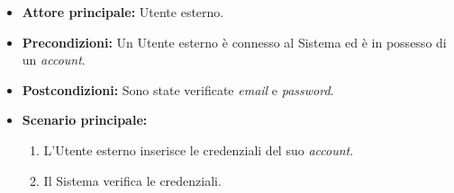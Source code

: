 \label{usecase:Accesso tradizionale}
\begin{itemize}

	\item \textbf{Attore principale:} Utente esterno.

	\item \textbf{Precondizioni:} Un Utente esterno è connesso al Sistema ed è in possesso di un \textit{account}.

	\item \textbf{Postcondizioni:} Sono state verificate \textit{email} e \textit{password}.

	\item \textbf{Scenario principale:}
	\begin{enumerate}
		\item L'Utente esterno inserisce le credenziali del suo \textit{account}.
		\item Il Sistema verifica le credenziali.
	\end{enumerate}

\end{itemize}
